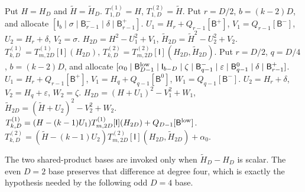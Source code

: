 \begin{algorithm}[H]
    \caption{Recursive construction of $T_{k,D}$, ordinary branches
    ($D=2^l$; $D\ge4$ in the even branch and $D\ge8$ in the odd branch).}
    \label{alg:constr-Tk2l}
    \begin{algorithmic}
        \State Put $H=H_D$ and $\widetilde H=\widetilde H_D$.
            \State $T^{(1)}_{1,D}=H$, \qquad $T^{(2)}_{1,D}=\widetilde H$.
            \State Put $r=D/2$, $b=(k-2)D$, and allocate
            $[\mathsf I_b\mid\sigma\mid\mathsf B^-_{r-1}
              \mid\delta\mid\mathsf B^+_{r-1}]$.
            \State $U_1=H_r+Q_{r-1}[\mathsf B^+]$,
            $V_1=Q_{r-1}[\mathsf B^-]$,
            $U_2=H_r+\delta$, $V_2=\sigma$.
            \State $H_{2D}=H^2-U_1^2+V_1$, \qquad
            $\widetilde H_{2D}=\widetilde H^2-U_2^2+V_2$.
            \State $T^{(1)}_{k,D}=T^{(1)}_{m,2D}[\mathsf I](H_{2D})$,
            \qquad
            $T^{(2)}_{k,D}=T^{(2)}_{m,2D}[\mathsf I]
              (H_{2D},\widetilde H_{2D})$.
        \Else {}
            \State Put $r=D/2$, $q=D/4$, $b=(k-2)D$, and allocate
            \Statex \hspace{\algorithmicindent}$[\alpha_0\mid\mathsf B^{\rm low}_{D-1}
              \mid\mathsf I_{b-D}\mid\zeta\mid\mathsf B^-_{q-1}
              \mid\varepsilon\mid\mathsf B^0_{q-1}
              \mid\delta\mid\mathsf B^+_{r-1}]$.
            \State $U_1=H_r+Q_{r-1}[\mathsf B^+]$,
            $V_1=H_q+Q_{q-1}[\mathsf B^0]$,
            $W_1=Q_{q-1}[\mathsf B^-]$.
            \State $U_2=H_r+\delta$, $V_2=H_q+\varepsilon$,
            $W_2=\zeta$.
            \State $H_{2D}=(H+U_1)^2-V_1^2+W_1$, \qquad
            $\widetilde H_{2D}=(\widetilde H+U_2)^2-V_2^2+W_2$.
            \State $T^{(1)}_{k,D}=(H-(k-1)U_1)
              T^{(1)}_{m,2D}[\mathsf I](H_{2D})
              +Q_{D-1}[\mathsf B^{\rm low}]$.
            \State $T^{(2)}_{k,D}=(\widetilde H-(k-1)U_2)
              T^{(2)}_{m,2D}[\mathsf I](H_{2D},\widetilde H_{2D})
              +\alpha_0$.
        \EndIf
    \end{algorithmic}
\end{algorithm}

The two shared-product bases are invoked only when
$\widetilde H_D-H_D$ is scalar.  The even $D=2$ base preserves that
difference at degree four, which is exactly the hypothesis needed by the
following odd $D=4$ base.

